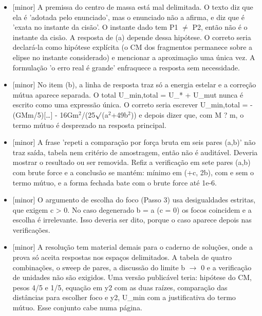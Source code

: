 \documentclass{article}%
\begin{document}
\begin{itemize}%
\item%
{[}minor{]} A premissa do centro de massa está mal delimitada. O texto diz que ela é 'adotada pelo enunciado', mas o enunciado não a afirma, e diz que é 'exata no instante da cisão'. O instante dado tem P1 $\neq$ P2, então não é o instante da cisão. A resposta de (a) depende dessa hipótese. O correto seria declará{-}la como hipótese explícita (o CM dos fragmentos permanece sobre a elipse no instante considerado) e mencionar a aproximação uma única vez. A formulação 'o erro real é grande' enfraquece a resposta sem necessidade.%
\item%
{[}minor{]} No item (b), a linha de resposta traz só a energia estelar e a correção mútua aparece separada. O total U\_min,total = U\_* + U\_mut nunca é escrito como uma expressão única. O correto seria escrever U\_min,total = -(GMm/5){[}\ldots{}{]} - 16Gm$^2$/(25$\surd$(a$^2$+49b$^2$)) e depois dizer que, com M ? m, o termo mútuo é desprezado na resposta principal.%
\item%
{[}minor{]} A frase 'repeti a comparação por força bruta em seis pares (a,b)' não traz saída, tabela nem critério de amostragem, então não é auditável. Deveria mostrar o resultado ou ser removida. Refiz a verificação em sete pares (a,b) com brute force e a conclusão se mantém: mínimo em (+c, 2b), com e sem o termo mútuo, e a forma fechada bate com o brute force até 1e{-}6.%
\item%
{[}minor{]} O argumento de escolha do foco (Passo 3) usa desigualdades estritas, que exigem c > 0. No caso degenerado b = a (c = 0) os focos coincidem e a escolha é irrelevante. Isso deveria ser dito, porque o caso aparece depois nas verificações.%
\item%
{[}minor{]} A resolução tem material demais para o caderno de soluções, onde a prova só aceita respostas nos espaços delimitados. A tabela de quatro combinações, o sweep de pares, a discussão do limite b $\to$ 0 e a verificação de unidades não são exigidos. Uma versão publicável teria: hipótese do CM, pesos 4/5 e 1/5, equação em y2 com as duas raízes, comparação das distâncias para escolher foco e y2, U\_min com a justificativa do termo mútuo. Esse conjunto cabe numa página.%
\end{itemize}%
\end{document}
